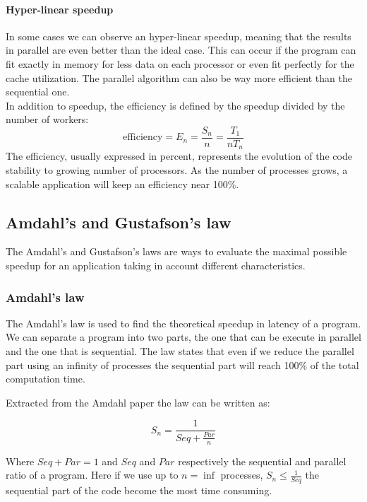 \paragraph{Hyper-linear speedup}
In some cases we can observe an hyper-linear speedup, meaning that the results in parallel are even better than the ideal case. 
This can occur if the program can fit exactly in memory for less data on each processor or even fit perfectly for the cache utilization. 
The parallel algorithm can also be way more efficient than the sequential one.\\

In addition to speedup, the efficiency is defined by the speedup divided by the number of workers: 
\begin{equation}
\text{efficiency} = E_n = \frac{S_n}{n} = \frac{T_1}{nT_n}
\end{equation}
The efficiency, usually expressed in percent, represents the evolution of the code stability to growing number of processors. 
As the number of processes grows, a scalable application will keep an efficiency near 100\%.

\subsection{Amdahl's and Gustafson's law}
The Amdahl's and Gustafson's laws are ways to evaluate the maximal possible speedup for an application taking in account different characteristics. 

\subsubsection{Amdahl's law}
The Amdahl's law\cite{amdahl1967validity} is used to find the theoretical speedup in latency of a program.
We can separate a program into two parts, the one that can be execute in parallel and the one that is sequential. 
The law states that even if we reduce the parallel part using an infinity of processes the sequential part will reach 100\% of the total computation time. 

Extracted from the Amdahl paper the law can be written as: 

\begin{equation}
S_n = \frac{1}{Seq + \frac{Par}{n}}
\end{equation}

Where $Seq + Par = 1$ and $Seq$ and $Par$ respectively the sequential and parallel ratio of a program.
Here if we use up to $n=\inf$ processes, $S_n \leq \frac{1}{Seq}$ the sequential part of the code become the most time consuming. 

